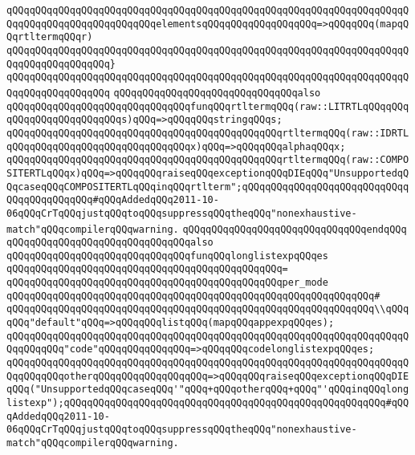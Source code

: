 \verb|qQQqqQQqqQQqqQQqqQQqqQQqqQQqqQQqqQQqqQQqqQQqqQQqqQQqqQQqqQQqqQQqqQQqqQQqqQQqqQQqqQQqqQQqqQQqqQQqelementsqQQqqQQqqQQqqQQqqQQq=>qQQqqQQq(mapqQQqrtltermqQQqr)|\newline
\verb|qQQqqQQqqQQqqQQqqQQqqQQqqQQqqQQqqQQqqQQqqQQqqQQqqQQqqQQqqQQqqQQqqQQqqQQqqQQqqQQqqQQqqQQq}|\newline
\verb|qQQqqQQqqQQqqQQqqQQqqQQqqQQqqQQqqQQqqQQqqQQqqQQqqQQqqQQqqQQqqQQqqQQqqQQqqQQqqQQqqQQqqQQq|\newline
\newline
\verb|qQQqqQQqqQQqqQQqqQQqqQQqqQQqqQQqalso|\newline
\verb|qQQqqQQqqQQqqQQqqQQqqQQqqQQqqQQqfunqQQqrtltermqQQq(raw::LITRTLqQQqqQQqqQQqqQQqqQQqqQQqqQQqs)qQQq=>qQQqqQQqstringqQQqs;|\newline
\verb|qQQqqQQqqQQqqQQqqQQqqQQqqQQqqQQqqQQqqQQqqQQqqQQqrtltermqQQq(raw::IDRTLqQQqqQQqqQQqqQQqqQQqqQQqqQQqqQQqx)qQQq=>qQQqqQQqalphaqQQqx;|\newline
\verb|qQQqqQQqqQQqqQQqqQQqqQQqqQQqqQQqqQQqqQQqqQQqqQQqrtltermqQQq(raw::COMPOSITERTLqQQqx)qQQq=>qQQqqQQqraiseqQQqexceptionqQQqDIEqQQq"UnsupportedqQQqcaseqQQqCOMPOSITERTLqQQqinqQQqrtlterm";qQQqqQQqqQQqqQQqqQQqqQQqqQQqqQQqqQQqqQQqqQQq#qQQqAddedqQQq2011-10-06qQQqCrTqQQqjustqQQqtoqQQqsuppressqQQqtheqQQq"nonexhaustive-match"qQQqcompilerqQQqwarning.|\newline
\verb|qQQqqQQqqQQqqQQqqQQqqQQqqQQqqQQqendqQQq|\newline
\newline
\verb|qQQqqQQqqQQqqQQqqQQqqQQqqQQqqQQqalso|\newline
\verb|qQQqqQQqqQQqqQQqqQQqqQQqqQQqqQQqfunqQQqlonglistexpqQQqes|\newline
\verb|qQQqqQQqqQQqqQQqqQQqqQQqqQQqqQQqqQQqqQQqqQQqqQQq=|\newline
\verb|qQQqqQQqqQQqqQQqqQQqqQQqqQQqqQQqqQQqqQQqqQQqqQQqper_mode|\newline
\verb|qQQqqQQqqQQqqQQqqQQqqQQqqQQqqQQqqQQqqQQqqQQqqQQqqQQqqQQqqQQqqQQq#|\newline
\verb|qQQqqQQqqQQqqQQqqQQqqQQqqQQqqQQqqQQqqQQqqQQqqQQqqQQqqQQqqQQqqQQq\\qQQqqQQq"default"qQQq=>qQQqqQQqlistqQQq(mapqQQqappexpqQQqes);|\newline
\verb|qQQqqQQqqQQqqQQqqQQqqQQqqQQqqQQqqQQqqQQqqQQqqQQqqQQqqQQqqQQqqQQqqQQqqQQqqQQqqQQq"code"qQQqqQQqqQQqqQQq=>qQQqqQQqcodelonglistexpqQQqes;|\newline
\verb|qQQqqQQqqQQqqQQqqQQqqQQqqQQqqQQqqQQqqQQqqQQqqQQqqQQqqQQqqQQqqQQqqQQqqQQqqQQqqQQqotherqQQqqQQqqQQqqQQqqQQq=>qQQqqQQqraiseqQQqexceptionqQQqDIEqQQq("UnsupportedqQQqcaseqQQq'"qQQq+qQQqotherqQQq+qQQq"'qQQqinqQQqlonglistexp");qQQqqQQqqQQqqQQqqQQqqQQqqQQqqQQqqQQqqQQqqQQqqQQqqQQqqQQq#qQQqAddedqQQq2011-10-06qQQqCrTqQQqjustqQQqtoqQQqsuppressqQQqtheqQQq"nonexhaustive-match"qQQqcompilerqQQqwarning.|\newline
